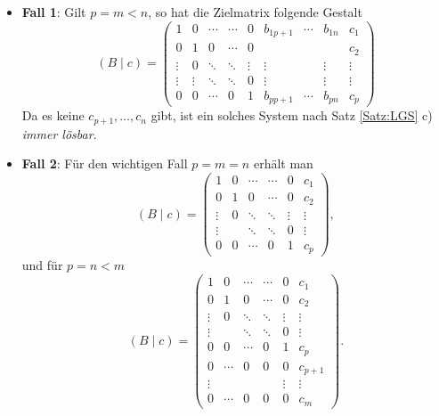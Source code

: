 \documentclass[a4paper,11pt,oneside]{article}
\theoremstyle{definition}
\begin{document}
\begin{itemize}
\item
\textbf{Fall 1}: Gilt $p=m<n$, so hat die Zielmatrix folgende Gestalt
\begin{equation*}
(B\mid c)=
\left(\begin{array}{cccccccc|c}
1&0&\cdots&\cdots&0&b_{1p+1}&\cdots&b_{1n}&c_1\\
0&1&0&\cdots&0&&&&c_2\\
\vdots&0&\ddots&\ddots&\vdots&\vdots&&\vdots&\vdots\\
\vdots&\vdots&\ddots&\ddots&0&\vdots&&\vdots&\vdots\\
0&0&\cdots&0&1&b_{pp+1}&\cdots&b_{pn}&c_p
\end{array}\right)
\end{equation*}
Da es keine $c_{p+1},\ldots,c_n$ gibt, ist ein solches System nach Satz \ref{Satz:LGS} c) \emph{immer lösbar}.
\item
\textbf{Fall 2}: Für den wichtigen Fall $p=m=n$ erhält man
\begin{equation*}
(B\mid c)=
\left(\begin{array}{ccccc|c}
1&0&\cdots&\cdots&0&c_1\\
0&1&0&\cdots&0&c_2\\
\vdots&0&\ddots&\ddots&\vdots&\vdots\\
\vdots&&\ddots&\ddots&0&\vdots\\
0&0&\cdots&0&1&c_p
\end{array}\right),
\end{equation*}
und für $p=n<m$
\begin{equation*}
(B\mid c)=
\left(\begin{array}{ccccc|c}
1&0&\cdots&\cdots&0&c_1\\
0&1&0&\cdots&0&c_2\\
\vdots&0&\ddots&\ddots&\vdots&\vdots\\
\vdots&&\ddots&\ddots&0&\vdots\\
0&0&\cdots&0&1&c_p\\
0&\cdots&0&0&0&c_{p+1}\\
\vdots&&&&\vdots&\vdots\\
0&\cdots&0&0&0&c_m
\end{array}\right).
\end{equation*}
\end{itemize}
\end{document}
